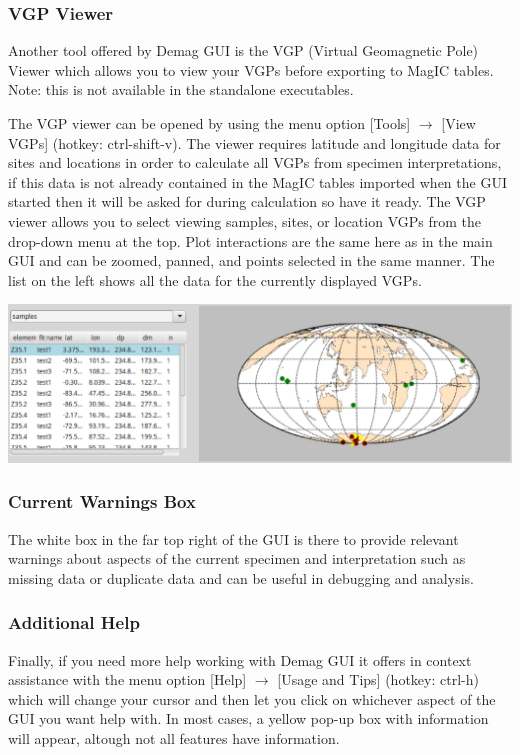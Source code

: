 \documentclass[11pt]{book}
\begin{document}
{{\subsubsection{VGP Viewer}\label{vgp-view}

Another tool offered by Demag GUI is the VGP (Virtual Geomagnetic Pole) Viewer which allows you to view your VGPs before exporting to MagIC tables. Note: this is not available in the standalone executables.

The VGP viewer can be opened by using the menu option [Tools] $\rightarrow$ [View VGPs] (hotkey: ctrl-shift-v). The viewer requires latitude and longitude data for sites and locations in order to calculate all VGPs from specimen interpretations, if this data is not already contained in the MagIC tables imported when the GUI started then it will be asked for during calculation so have it ready. The VGP viewer allows you to select viewing samples, sites, or location VGPs from the drop-down menu at the top. Plot interactions are the same here as in the main GUI and can be zoomed, panned, and points selected in the same manner. The list on the left shows all the data for the currently displayed VGPs.

\includegraphics[width=15 cm]{EPSFiles/demag_gui_VGPViewer.eps}

\subsubsection{Current Warnings Box}\label{warn-box}

The white box in the far top right of the GUI is there to provide relevant warnings about aspects of the current specimen and interpretation such as missing data or duplicate data and can be useful in debugging and analysis.

\subsubsection{Additional Help}\label{add-help}

Finally, if you need more help working with Demag GUI it offers in context assistance with the menu option [Help] $\rightarrow$ [Usage and Tips] (hotkey: ctrl-h) which will change your cursor and then let you click on whichever aspect of the GUI you want help with. In most cases, a yellow pop-up box with information will appear, altough not all features have information.

}}
\end{document}
